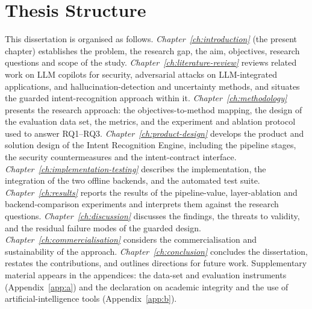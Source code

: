 \section{Thesis Structure}\label{sec:thesis-structure}

This dissertation is organised as follows. \emph{Chapter~\ref{ch:introduction}}
(the present chapter) establishes the problem, the research gap, the aim,
objectives, research questions and scope of the study.
\emph{Chapter~\ref{ch:literature-review}} reviews related work on LLM copilots
for security, adversarial attacks on LLM-integrated applications, and
hallucination-detection and uncertainty methods, and situates the guarded
intent-recognition approach within it.
\emph{Chapter~\ref{ch:methodology}} presents the research approach: the
objectives-to-method mapping, the design of the evaluation data set, the
metrics, and the experiment and ablation protocol used to answer RQ1--RQ3.
\emph{Chapter~\ref{ch:product-design}} develops the product and solution
design of the Intent Recognition Engine, including the pipeline stages, the
security countermeasures and the intent-contract interface.
\emph{Chapter~\ref{ch:implementation-testing}} describes the implementation,
the integration of the two offline backends, and the automated test suite.
\emph{Chapter~\ref{ch:results}} reports the results of the pipeline-value,
layer-ablation and backend-comparison experiments and interprets them against
the research questions.
\emph{Chapter~\ref{ch:discussion}} discusses the findings, the threats to
validity, and the residual failure modes of the guarded design.
\emph{Chapter~\ref{ch:commercialisation}} considers the commercialisation and
sustainability of the approach.
\emph{Chapter~\ref{ch:conclusion}} concludes the dissertation, restates the
contributions, and outlines directions for future work. Supplementary material
appears in the appendices: the data-set and evaluation instruments
(Appendix~\ref{app:a}) and the declaration on academic integrity and the use of
artificial-intelligence tools (Appendix~\ref{app:b}).